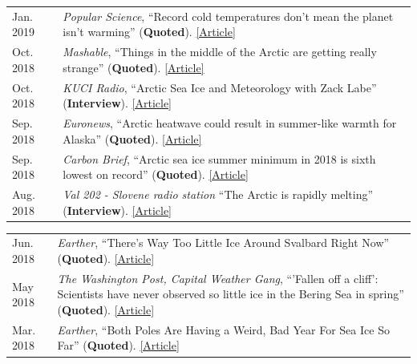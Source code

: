 \documentclass[margin,line,palatino,courier,10pt]{res}
\begin{document}
\begin{resume}
\begin{tabular}{@{}p{0.9in}p{4in}}
Jan. 2019 & \textit{Popular Science}, ``Record cold temperatures don't mean the planet isn't warming'' (\textbf{Quoted}). \href{https://www.popsci.com/cold-weather-climate-change}{[Article]}\\
Oct. 2018 & \textit{Mashable}, ``Things in the middle of the Arctic are getting really strange'' (\textbf{Quoted}). \href{https://mashable.com/article/low-arctic-ice-central-basin/#xQmvXhcFJPqH}{[Article]}\\
Oct. 2018 & \textit{KUCI Radio}, ``Arctic Sea Ice and Meteorology with Zack Labe'' (\textbf{Interview}). \href{https://thesciencespiel.org/2018/10/08/october-8-2018-arctic-sea-ice-and-meteorology-with-zack-labe/}{[Article]}\\
Sep. 2018 & \textit{Euronews}, ``Arctic heatwave could result in summer-like warmth for Alaska'' (\textbf{Quoted}). \href{https://www.euronews.com/2018/09/29/arctic-heatwave-could-result-in-summer-like-warmth-in-alaska}{[Article]}\\
Sep. 2018 & \textit{Carbon Brief}, ``Arctic sea ice summer minimum in 2018 is sixth lowest on record'' (\textbf{Quoted}). \href{https://www.carbonbrief.org/arctic-sea-ice-summer-minimum-in-2018-is-sixth-lowest-on-record}{[Article]}\\
Aug. 2018 & \textit{Val 202 - Slovene radio station} ``The Arctic is rapidly melting'' (\textbf{Interview}). \href{https://val202.rtvslo.si/2018/08/sonce-je-odprlo-zemljin-hladilnik/}{[Article]}\\
\end{tabular}
\begin{tabular}{@{}p{0.9in}p{4in}}
Jun. 2018 & \textit{Earther}, ``There's Way Too Little Ice Around Svalbard Right Now'' (\textbf{Quoted}). \href{https://earther.com/theres-way-too-little-ice-around-svalbard-right-now-1826567780}{[Article]}\\
May 2018 & \textit{The Washington Post, Capital Weather Gang}, ``'Fallen off a cliff': Scientists have never observed so little ice in the Bering Sea in spring'' (\textbf{Quoted}). \href{https://www.washingtonpost.com/news/capital-weather-gang/wp/2018/05/03/fallen-off-a-cliff-scientists-have-never-observed-so-little-ice-in-the-bering-sea-in-spring/?noredirect=on&utm_term=.cbcf2781b5e4}{[Article]}\\
Mar. 2018 & \textit{Earther}, ``Both Poles Are Having a Weird, Bad Year For Sea Ice So Far'' (\textbf{Quoted}). \href{https://earther.com/both-poles-are-having-a-weird-bad-year-for-sea-ice-so-1824074352}{[Article]}\\

\end{tabular}
\end{resume}
\end{document}

